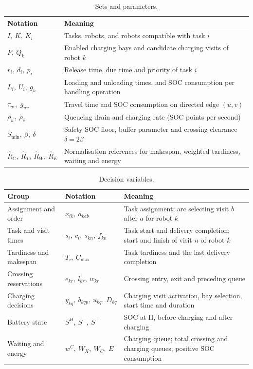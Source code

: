 \documentclass[11pt,a4paper]{article}
\begin{document}
\begin{table}[!htbp]
\centering\small
\caption{Sets and parameters.}
\label{tab:sets}
\begin{tabularx}{0.92\linewidth}{lX}
\toprule
Notation & Meaning \\
\midrule
$I,\ K,\ K_i$ & Tasks, robots, and robots compatible with task $i$ \\
$P,\ Q_k$ & Enabled charging bays and candidate charging visits of robot $k$ \\
$r_i,\ d_i,\ p_i$ & Release time, due time and priority of task $i$ \\
$L_i,\ U_i,\ g_h$ & Loading and unloading times, and SOC consumption per handling operation \\
$\tau_{uv},\ g_{uv}$ & Travel time and SOC consumption on directed edge $(u,v)$ \\
$\rho_w,\ \rho_c$ & Queueing drain and charging rate (SOC points per second) \\
$S_{\min},\ \beta,\ \delta$ & Safety SOC floor, buffer parameter and crossing clearance $\delta = 2\beta$ \\
$\hat R_C,\ \hat R_T,\ \hat R_W,\ \hat R_E$ & Normalisation references for makespan, weighted
tardiness, waiting and energy \\
\bottomrule
\end{tabularx}
\end{table}

\begin{table}[!htbp]
\centering\small
\caption{Decision variables.}
\label{tab:vars}
\begin{tabularx}{0.92\linewidth}{llX}
\toprule
Group & Notation & Meaning \\
\midrule
Assignment and order & $x_{ik},\ a_{kab}$ & Task assignment; arc selecting visit $b$ after $a$ for robot $k$ \\
Task and visit times & $s_i,\ c_i,\ s_{kn},\ f_{kn}$ & Task start and delivery completion; start
and finish of visit $n$ of robot $k$ \\
Tardiness and makespan & $T_i,\ C_{\max}$ & Task tardiness and the last delivery completion \\
Crossing reservations & $e_{kr},\ l_{kr},\ w_{kr}$ & Crossing entry, exit and preceding queue \\
Charging decisions & $y_{kq},\ b_{kqp},\ u_{kq},\ D_{kq}$ & Charging visit activation, bay
selection, start time and duration \\
Battery state & $S^{H},\ S^{-},\ S^{+}$ & SOC at H, before charging and after charging \\
Waiting and energy & $w^{C},\ W_X,\ W_C,\ E$ & Charging queue; total crossing and charging queues;
positive SOC consumption \\
\bottomrule
\end{tabularx}
\end{table}
\end{document}
